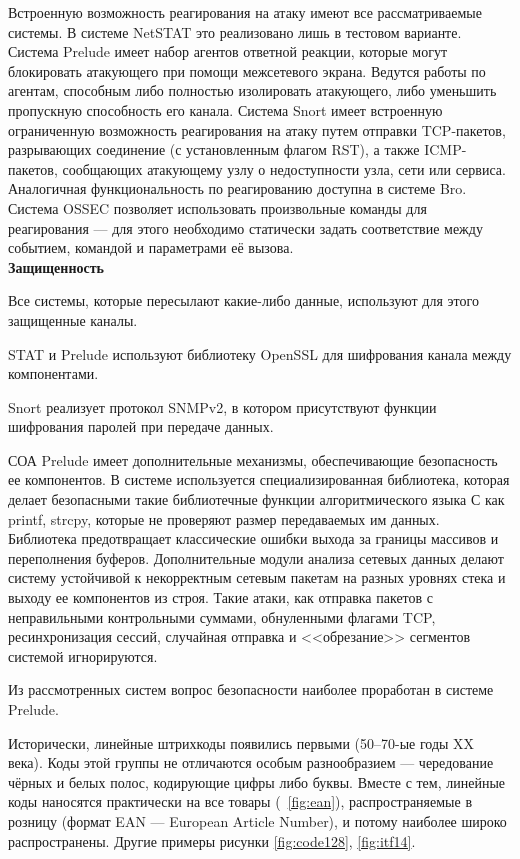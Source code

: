 Встроенную возможность реагирования на атаку имеют все рассматриваемые
системы. В системе NetSTAT это реализовано лишь в тестовом варианте. Система
Prelude имеет набор агентов ответной реакции, которые могут блокировать атакующего
при помощи межсетевого экрана. Ведутся работы по агентам, способным либо
полностью изолировать атакующего, либо уменьшить пропускную способность его
канала. Система Snort имеет встроенную ограниченную возможность реагирования на
атаку путем отправки TCP-пакетов, разрывающих соединение (с установленным
флагом RST), а также ICMP-пакетов, сообщающих атакующему узлу о недоступности
узла, сети или сервиса. Аналогичная функциональность по реагированию доступна в
системе Bro. Система OSSEC позволяет использовать произвольные команды для
реагирования --- для этого необходимо статически задать соответствие между событием,
командой и параметрами её вызова.\\

\textbf{Защищенность}

Все системы, которые пересылают какие-либо данные, используют для этого
защищенные каналы. 

STAT и Prelude используют библиотеку OpenSSL для
шифрования канала между компонентами. 

Snort реализует протокол SNMPv2, в
котором присутствуют функции шифрования паролей при передаче данных.

СОА Prelude имеет дополнительные механизмы, обеспечивающие безопасность ее
компонентов. В системе используется специализированная библиотека, которая делает
безопасными такие библиотечные функции алгоритмического языка С как printf, strcpy,
которые не проверяют размер передаваемых им данных. Библиотека предотвращает
классические ошибки выхода за границы массивов и переполнения буферов.
Дополнительные модули анализа сетевых данных делают систему устойчивой к
некорректным сетевым пакетам на разных уровнях стека и выходу ее компонентов из
строя. Такие атаки, как отправка пакетов с неправильными контрольными суммами,
обнуленными флагами TCP, ресинхронизация сессий, случайная отправка и
<<обрезание>> сегментов системой игнорируются.

Из рассмотренных систем вопрос безопасности наиболее проработан в системе
Prelude.




Исторически, линейные штрихкоды появились первыми (50--70-ые годы 
XX века). Коды этой группы не отличаются особым разнообразием ---
чередование чёрных и белых полос, кодирующие цифры либо буквы. Вместе
с тем, линейные коды наносятся практически на все товары 
(\figurename\ \ref{fig:ean}), 
распространяемые в розницу (формат EAN --- European Article Number),
и потому наиболее широко распространены. Другие примеры рисунки 
\ref{fig:code128}, \ref{fig:itf14}. 

